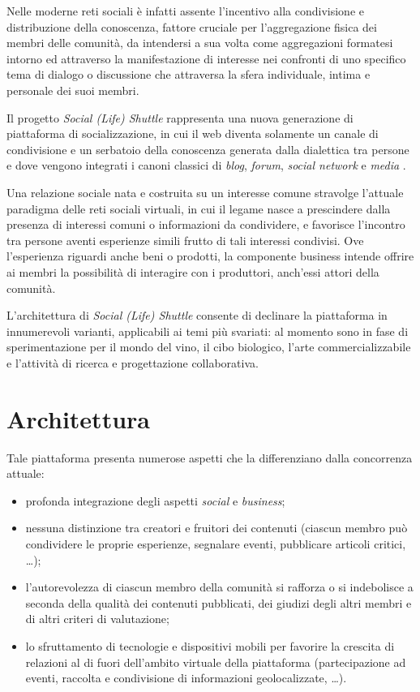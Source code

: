 Nelle moderne reti sociali è infatti assente l'incentivo alla condivisione e distribuzione della conoscenza, fattore cruciale per l'aggregazione fisica dei membri delle comunità, da intendersi a sua volta come aggregazioni formatesi intorno ed attraverso la manifestazione di interesse nei confronti di uno specifico tema di dialogo o discussione che attraversa la sfera individuale, intima e personale dei suoi membri.

Il progetto \textit{Social (Life) Shuttle} rappresenta una nuova generazione di piattaforma di socializzazione, in cui il web diventa solamente un canale di condivisione e un serbatoio della conoscenza generata dalla dialettica tra persone e dove vengono integrati i canoni classici di \textit{blog}, \textit{forum}, \textit{social network} e \textit{media} .

Una relazione sociale nata e costruita su un interesse comune stravolge l'attuale paradigma delle reti sociali virtuali, in cui il legame nasce a prescindere dalla presenza di interessi comuni o informazioni da condividere, e favorisce l'incontro tra persone aventi esperienze simili frutto di tali interessi condivisi. Ove l'esperienza riguardi anche beni o prodotti, la componente business intende offrire ai membri la possibilità di interagire con i produttori, anch'essi attori della comunità.

L'architettura di \textit{Social (Life) Shuttle} consente di declinare la piattaforma in innumerevoli varianti, applicabili ai temi più svariati: al momento sono in fase di sperimentazione per il mondo del vino, il cibo biologico, l'arte commercializzabile e l'attività di ricerca e progettazione collaborativa. 

\section{Architettura}
\label{sec:tesi:progetto:architettura}
Tale piattaforma presenta numerose aspetti che la differenziano dalla concorrenza attuale:
\begin{itemize}
	\item profonda integrazione degli aspetti \textit{social} e \textit{business};
	\item nessuna distinzione tra creatori e fruitori dei contenuti (ciascun membro può condividere le proprie esperienze, segnalare eventi, pubblicare articoli critici, \ldots);
	\item l'autorevolezza di ciascun membro della comunità si rafforza o si indebolisce a seconda della qualità dei contenuti pubblicati, dei giudizi degli altri membri e di altri criteri di valutazione;
	\item lo sfruttamento di tecnologie e dispositivi mobili per favorire la crescita di relazioni al di fuori dell'ambito virtuale della piattaforma (partecipazione ad eventi, raccolta e condivisione di informazioni geolocalizzate, \ldots).
\end{itemize}

